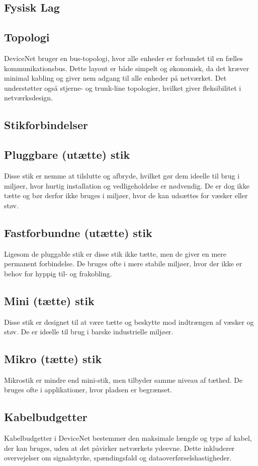 \subsection{Fysisk Lag}
\subsection*{Topologi}
DeviceNet bruger en bus-topologi, hvor alle enheder er forbundet til en fælles kommunikationsbus. Dette layout er både simpelt og økonomisk, da det kræver minimal kabling og giver nem adgang til alle enheder på netværket. Det understøtter også stjerne- og trunk-line topologier, hvilket giver fleksibilitet i netværksdesign.

\subsection{Stikforbindelser}
\subsection*{Pluggbare (utætte) stik}
Disse stik er nemme at tilslutte og afbryde, hvilket gør dem ideelle til brug i miljøer, hvor hurtig installation og vedligeholdelse er nødvendig. De er dog ikke tætte og bør derfor ikke bruges i miljøer, hvor de kan udsættes for væsker eller støv.

\subsection*{Fastforbundne (utætte) stik}
Ligesom de pluggable stik er disse stik ikke tætte, men de giver en mere permanent forbindelse. De bruges ofte i mere stabile miljøer, hvor der ikke er behov for hyppig til- og frakobling.

\subsection*{Mini (tætte) stik}
Disse stik er designet til at være tætte og beskytte mod indtrængen af væsker og støv. De er ideelle til brug i barske industrielle miljøer.

\subsection*{Mikro (tætte) stik}
Mikrostik er mindre end mini-stik, men tilbyder samme niveau af tæthed. De bruges ofte i applikationer, hvor pladsen er begrænset.

\subsection{Kabelbudgetter}
Kabelbudgetter i DeviceNet bestemmer den maksimale længde og type af kabel, der kan bruges, uden at det påvirker netværkets ydeevne. Dette inkluderer overvejelser om signalstyrke, spændingsfald og dataoverførselshastigheder.

